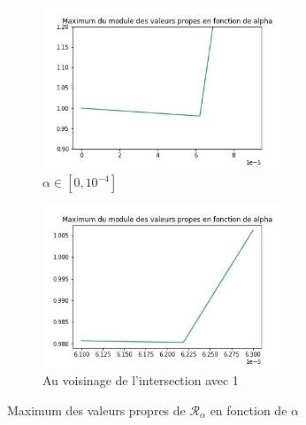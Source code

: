 \documentclass[12pt]{report}
\begin{document}
\begin{figure}
    \centering
    \begin{subfigure}[b]{0.4\textwidth}
        \centering
        \includegraphics[width=0.8\textwidth, height=0.8\textwidth]{choix_alpha_1D.jpg}
        \caption{$\alpha \in [0, 10^{-4}]$}
    \end{subfigure}
    \hfill
    \begin{subfigure}[b]{0.4\textwidth}
        \centering
        \includegraphics[width=0.8\textwidth, height=0.8\textwidth]{choix_alpha_1D_zoom.jpg}
        \caption{Au voisinage de l'intersection avec 1}
    \end{subfigure}
       \caption{Maximum des valeurs propres de $\mathcal{R}_\alpha$ en fonction de $\alpha$}
       \label{fig:choix alpha 1D}
\end{figure}
\end{document}
